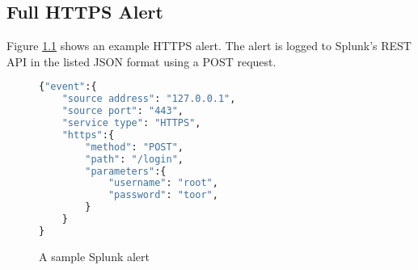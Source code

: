 \begin{appendices}

\chapter{Full HTTPS Alert}
\label{appendix:https-alert}

Figure \ref{figure:sample-alert} shows an example HTTPS alert. The alert is
logged to Splunk's REST API in the listed JSON format using a POST request.

\begin{figure}[h]
\begin{lstlisting}[language=Python,frame=single,showstringspaces=false]
{"event":{
    "source address": "127.0.0.1",
    "source port": "443",
    "service type": "HTTPS",
    "https":{
        "method": "POST",
        "path": "/login",
        "parameters":{
            "username": "root",
            "password": "toor",
        }
    }
}
\end{lstlisting}
\caption{A sample Splunk alert}
\label{figure:sample-alert}
\end{figure}

\end{appendices}
